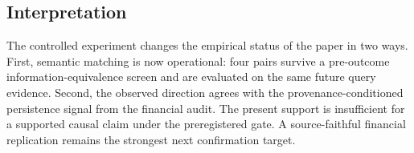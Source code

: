 \subsection{Interpretation}
The controlled experiment changes the empirical status of the paper in two ways. First, semantic matching is now operational: four pairs survive a pre-outcome information-equivalence screen and are evaluated on the same future query evidence. Second, the observed direction agrees with the provenance-conditioned persistence signal from the financial audit. The present support is insufficient for a supported causal claim under the preregistered gate. A source-faithful financial replication remains the strongest next confirmation target.
